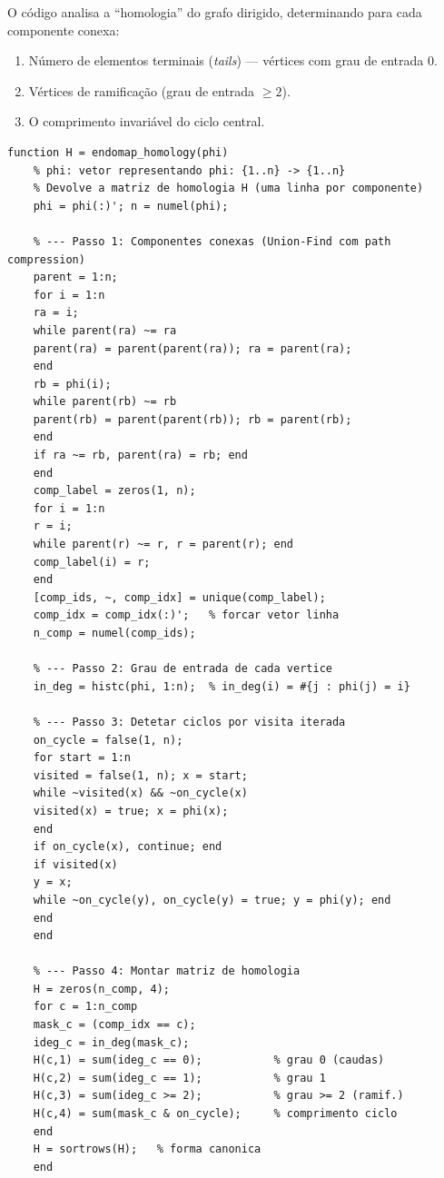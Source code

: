 O código analisa a ``homologia'' do grafo dirigido, determinando
para cada componente conexa:
\begin{enumerate}
	\item Número de elementos terminais (\textit{tails}) ---
	vértices com grau de entrada 0.
	\item Vértices de ramificação (grau de entrada $\geq 2$).
	\item O comprimento invariável do ciclo central.
\end{enumerate}

\begin{lstlisting}[style=matlab, caption={Cálculo da matriz de homologia de um endomapa}]
	function H = endomap_homology(phi)
	% phi: vetor representando phi: {1..n} -> {1..n}
	% Devolve a matriz de homologia H (uma linha por componente)
	phi = phi(:)'; n = numel(phi);
	
	% --- Passo 1: Componentes conexas (Union-Find com path compression)
	parent = 1:n;
	for i = 1:n
	ra = i;
	while parent(ra) ~= ra
	parent(ra) = parent(parent(ra)); ra = parent(ra);
	end
	rb = phi(i);
	while parent(rb) ~= rb
	parent(rb) = parent(parent(rb)); rb = parent(rb);
	end
	if ra ~= rb, parent(ra) = rb; end
	end
	comp_label = zeros(1, n);
	for i = 1:n
	r = i;
	while parent(r) ~= r, r = parent(r); end
	comp_label(i) = r;
	end
	[comp_ids, ~, comp_idx] = unique(comp_label);
	comp_idx = comp_idx(:)';   % forcar vetor linha
	n_comp = numel(comp_ids);
	
	% --- Passo 2: Grau de entrada de cada vertice
	in_deg = histc(phi, 1:n);  % in_deg(i) = #{j : phi(j) = i}
	
	% --- Passo 3: Detetar ciclos por visita iterada
	on_cycle = false(1, n);
	for start = 1:n
	visited = false(1, n); x = start;
	while ~visited(x) && ~on_cycle(x)
	visited(x) = true; x = phi(x);
	end
	if on_cycle(x), continue; end
	if visited(x)
	y = x;
	while ~on_cycle(y), on_cycle(y) = true; y = phi(y); end
	end
	end
	
	% --- Passo 4: Montar matriz de homologia
	H = zeros(n_comp, 4);
	for c = 1:n_comp
	mask_c = (comp_idx == c);
	ideg_c = in_deg(mask_c);
	H(c,1) = sum(ideg_c == 0);           % grau 0 (caudas)
	H(c,2) = sum(ideg_c == 1);           % grau 1
	H(c,3) = sum(ideg_c >= 2);           % grau >= 2 (ramif.)
	H(c,4) = sum(mask_c & on_cycle);     % comprimento ciclo
	end
	H = sortrows(H);   % forma canonica
	end
\end{lstlisting}

